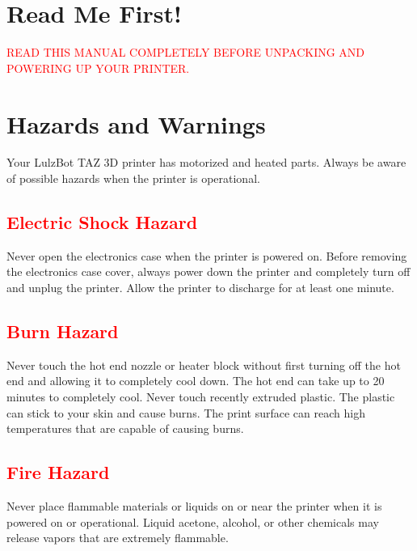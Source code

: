 %
%
%
%
%

\section{Read Me First!}
\textcolor{red}{READ THIS MANUAL COMPLETELY BEFORE UNPACKING AND POWERING UP YOUR PRINTER.}

\section{Hazards and Warnings}

Your LulzBot TAZ 3D printer has motorized and heated parts.  Always be aware of possible hazards when the printer is operational.


\subsection{\textcolor{red}{Electric Shock Hazard}}
Never open the electronics case when the printer is powered on. Before removing the electronics case cover, always power down the printer and completely turn off and unplug the printer. Allow the printer to discharge for at least one minute.

\subsection{\textcolor{red}{Burn Hazard}}
Never touch the hot end nozzle or heater block without first turning off the hot end and allowing it to completely cool down. The hot end can take up to 20 minutes to completely cool. Never touch recently extruded plastic. The plastic can stick to your skin and cause burns. The print surface can reach high temperatures that are capable of causing burns.

\subsection{\textcolor{red}{Fire Hazard}}
Never place flammable materials or liquids on or near the printer when it is powered on or operational. Liquid acetone, alcohol, or other chemicals may release vapors that are extremely flammable.

